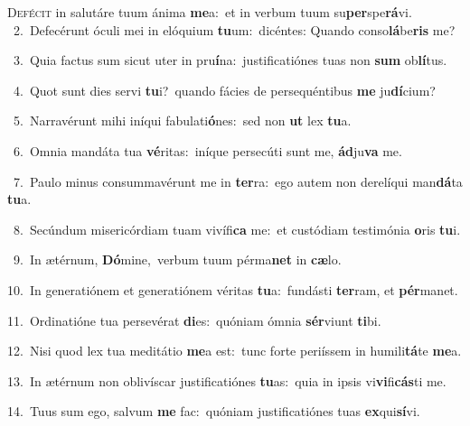 \lettrine{\initial\textcolor{\initialcolor}{D}}{efécit} in salutáre tuum ánima \textbf{me}\-a:~\star et in verbum tuum su\-\textbf{per}\-spe\-\textbf{rá}\-vi.\\
{\numbfont\textcolor{\numbcolor}{~2.}}~Defecérunt óculi mei in elóquium \textbf{tu}\-um:~\star dicéntes: Quando conso\-\textbf{lá}\-be\textbf{ris} me?\par
{\numbfont\textcolor{\numbcolor}{~3.}}~Quia factus sum sicut uter in pru\-\textbf{í}\-na:~\star justificatiónes tuas non \textbf{sum} ob\-\textbf{lí}\-tus.\par
{\numbfont\textcolor{\numbcolor}{~4.}}~Quot sunt dies servi \textbf{tu}\-i?~\star quando fácies de persequéntibus \textbf{me} ju\-\textbf{dí}\-cium?\par
{\numbfont\textcolor{\numbcolor}{~5.}}~Narravérunt mihi iníqui fabulati\-\textbf{ó}\-nes:~\star sed non \textbf{ut} lex \textbf{tu}\-a.\par
{\numbfont\textcolor{\numbcolor}{~6.}}~Omnia mandáta tua \textbf{vé}\-ritas:~\star iníque persecúti sunt me, \textbf{ád}\-ju\textbf{va} me.\par
{\numbfont\textcolor{\numbcolor}{~7.}}~Paulo minus consummavérunt me in \textbf{ter}\-ra:~\star ego autem non derelíqui man\-\textbf{dá}\-ta \textbf{tu}\-a.\par
{\numbfont\textcolor{\numbcolor}{~8.}}~Secúndum misericórdiam tuam vivífi\textbf{ca} me:~\star et custódiam testimónia \textbf{o}\-ris \textbf{tu}\-i.\par
{\numbfont\textcolor{\numbcolor}{~9.}}~In ætérnum, \textbf{Dó}\-mine,~\star verbum tuum pérma\textbf{net} in \textbf{cæ}\-lo.\par
{\numbfont\textcolor{\numbcolor}{10.}}~In generatiónem et generatiónem véritas \textbf{tu}\-a:~\star fundásti \textbf{ter}\-ram, et \textbf{pér}\-manet.\par
{\numbfont\textcolor{\numbcolor}{11.}}~Ordinatióne tua persevérat \textbf{di}\-es:~\star quóniam ómnia \textbf{sér}\-viunt \textbf{ti}\-bi.\par
{\numbfont\textcolor{\numbcolor}{12.}}~Nisi quod lex tua meditátio \textbf{me}\-a est:~\star tunc forte periíssem in humili\-\textbf{tá}\-te \textbf{me}\-a.\par
{\numbfont\textcolor{\numbcolor}{13.}}~In ætérnum non oblivíscar justificatiónes \textbf{tu}\-as:~\star quia in ipsis vi\-\textbf{vi}\-fi\-\textbf{cás}\-ti me.\par
{\numbfont\textcolor{\numbcolor}{14.}}~Tuus sum ego, salvum \textbf{me} fac:~\star quóniam justificatiónes tuas \textbf{ex}\-qui\-\textbf{sí}\-vi.\par
